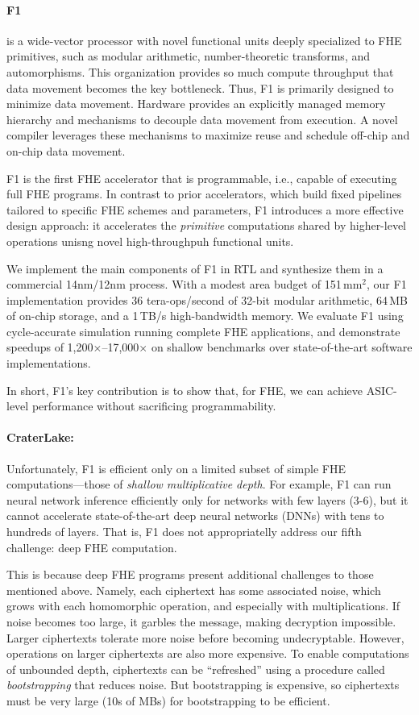 \paragraph{F1} is a wide-vector processor with novel functional units deeply
specialized to FHE primitives, such as modular arithmetic, number-theoretic
transforms, and automorphisms. This organization provides so much compute
throughput that data movement becomes the key bottleneck. Thus, F1 is primarily
designed to minimize data movement. Hardware provides an explicitly managed
memory hierarchy and mechanisms to decouple data movement from execution. A
novel compiler leverages these mechanisms to maximize reuse and schedule
off-chip and on-chip data movement.

F1 is the first FHE accelerator that is programmable, i.e., capable of executing
full FHE programs. In contrast to prior accelerators, which build fixed pipelines
tailored to specific FHE schemes and parameters, F1 introduces a more effective
design approach: it accelerates the \emph{primitive} computations shared by
higher-level operations unisng novel high-throughpuh functional units.

We implement the main components of F1 in RTL and synthesize them in a
commercial 14nm/12nm process. With a modest area budget of 151\,mm$^2$, our F1
implementation provides 36 tera-ops/second of 32-bit modular arithmetic, 64\,MB
of on-chip storage, and a 1\,TB/s high-bandwidth memory. We evaluate F1 using
cycle-accurate simulation running complete FHE applications, and demonstrate
speedups of 1,200$\times$--17,000$\times$ on shallow benchmarks over
state-of-the-art software implementations.

In short, F1's key contribution is to show that, for FHE, we can achieve
ASIC-level performance without sacrificing programmability.


\paragraph{CraterLake:}
Unfortunately, F1 is efficient only on a limited subset of simple FHE
computations---those of \emph{shallow multiplicative depth}. For example, F1
can run neural network inference efficiently only for networks with few layers
(3-6), but it cannot accelerate state-of-the-art deep neural networks (DNNs)
with tens to hundreds of layers. That is, F1 does not appropriatelly address
our fifth challenge: deep FHE computation.

This is because deep FHE programs present additional challenges to those
mentioned above. Namely, each ciphertext has some associated noise, which grows
with each homomorphic operation, and especially with multiplications. If noise
becomes too large, it garbles the message, making decryption impossible. Larger
ciphertexts tolerate more noise before becoming undecryptable. However,
operations on larger ciphertexts are also more expensive. To enable
computations of unbounded depth, ciphertexts can be ``refreshed'' using a
procedure called \emph{bootstrapping} that reduces noise. But bootstrapping is
expensive, so ciphertexts must be very large (10s of MBs) for bootstrapping to
be efficient.

